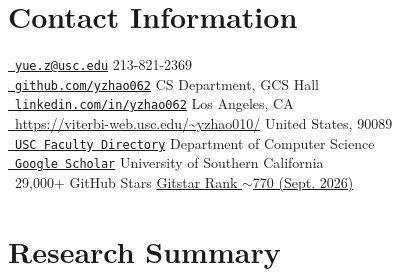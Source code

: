 \documentclass[margin,line,pifont,palatino,courier]{res}
\begin{document}
\name{{\huge Yue Zhao} %
\vspace*{.05in}} 

\begin{resume}

\section{\sc Contact Information}

\href{mailto:yue.z@usc.edu}{\faEnvelope[regular]~\texttt{yue.z@usc.edu}}  \hfill 213-821-2369
 \\
\href{https://github.com/yzhao062}
{\faGithub~\texttt{github.com/yzhao062}} 
\hfill CS Department, GCS Hall\\
\href{https://www.linkedin.com/in/yzhao062/}{\faLinkedinIn ~\texttt{linkedin.com/in/yzhao062}}  \hfill Los Angeles, CA \\
\href{https://viterbi-web.usc.edu/~yzhao010/}{\faHome~\url{https://viterbi-web.usc.edu/~yzhao010/}}  \hfill United States, 90089 \\
{\href{https://viterbi.usc.edu/directory/faculty/Zhao/Yue}{\faSchool~\texttt{USC Faculty Directory}}} 
\hfill Department of Computer Science\\
{\href{https://scholar.google.com/citations?user=zoGDYsoAAAAJ}{\faGoogle~\texttt{Google Scholar}}}  
\hfill University of Southern California\\
{\color{uscred}\faStar~29{,}000+ GitHub Stars \hfill
\href{https://gitstar-ranking.com/yzhao062}{Gitstar Rank $\sim$770 (Sept. 2026)}}
\vspace{-0.1in}

\section{\sc Research Summary}


\end{resume}
\end{document}
